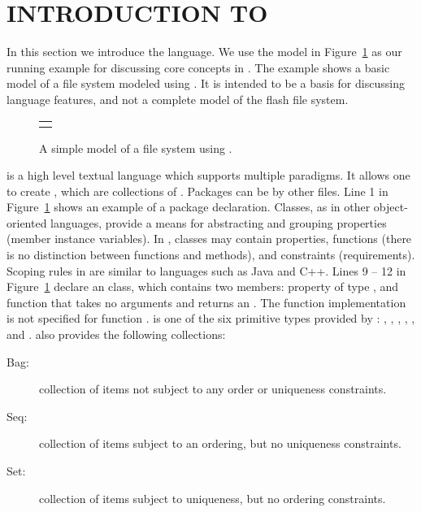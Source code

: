 \section{INTRODUCTION TO \Klang{}}
\label{sec:k-syntax}

In this section we introduce the \Klang{} language. We use the
\Klang{} model in Figure~\ref{fig:fs} as our running example for
discussing core concepts in \Klang{}. The example shows a basic model
of a file system modeled using \Klang{}. It is intended to be a
basis for discussing language features, and not a complete model of
the flash file system. 

\begin{figure}
  \centering
  \begin{tabular}{c}
    \small
    
    \end{tabular}
  \vspace{0.2cm}
  \caption{A simple model of a file system using \Klang{}.}
  \label{fig:fs}
\end{figure}
  
\Klang{} is a high level textual language which supports multiple
paradigms. It allows one to create , which are
collections of . Packages can be  by
other \Klang{} files. Line 1 in Figure~\ref{fig:fs} shows an example
of a package declaration. Classes, as in other object-oriented
languages, provide a means for abstracting and grouping properties
(member instance variables). In \Klang{}, classes may contain
properties, functions (there is no distinction between functions and
methods), and constraints (requirements). Scoping rules in \Klang{}
are similar to languages such as Java and C++. Lines 9 -- 12 in
Figure~\ref{fig:fs} declare an  class, which contains two
members: property  of type , and function
 that takes no arguments and returns an . The
function implementation is not specified for function
.  is one of the six primitive types provided
by \Klang{}: , , , ,
, and . \Klang{} also provides the following
collections:

\begin{description}
\item [Bag:] collection of items not subject to any order
  or uniqueness constraints.
\item [Seq:] collection of items subject to an ordering, but
  no uniqueness constraints.
\item [Set:] collection of items subject to uniqueness, but no
  ordering constraints.
\end{description}

